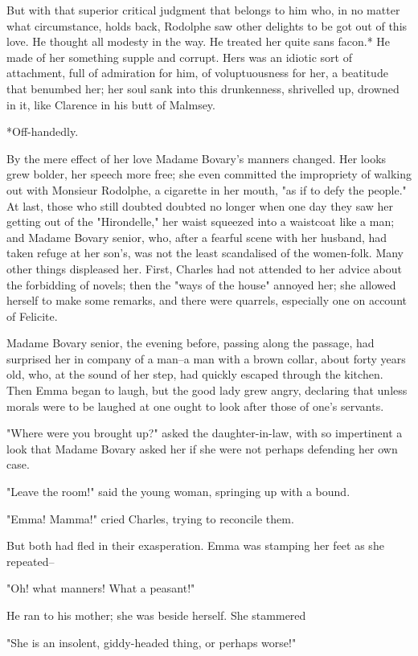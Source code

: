 \documentclass[11pt,twocolumn]{ltugboat}
\begin{document}
But with that superior critical judgment that belongs to him who, in no
matter what circumstance, holds back, Rodolphe saw other delights to be
got out of this love. He thought all modesty in the way. He treated her
quite sans facon.* He made of her something supple and corrupt. Hers
was an idiotic sort of attachment, full of admiration for him, of
voluptuousness for her, a beatitude that benumbed her; her soul sank
into this drunkenness, shrivelled up, drowned in it, like Clarence in
his butt of Malmsey.

     *Off-handedly.


By the mere effect of her love Madame Bovary's manners changed.
Her looks grew bolder, her speech more free; she even committed the
impropriety of walking out with Monsieur Rodolphe, a cigarette in her
mouth, "as if to defy the people." At last, those who still doubted
doubted no longer when one day they saw her getting out of the
"Hirondelle," her waist squeezed into a waistcoat like a man; and Madame
Bovary senior, who, after a fearful scene with her husband, had taken
refuge at her son's, was not the least scandalised of the women-folk.
Many other things displeased her. First, Charles had not attended to
her advice about the forbidding of novels; then the "ways of the house"
annoyed her; she allowed herself to make some remarks, and there were
quarrels, especially one on account of Felicite.

Madame Bovary senior, the evening before, passing along the passage,
had surprised her in company of a man--a man with a brown collar, about
forty years old, who, at the sound of her step, had quickly escaped
through the kitchen. Then Emma began to laugh, but the good lady grew
angry, declaring that unless morals were to be laughed at one ought to
look after those of one's servants.

"Where were you brought up?" asked the daughter-in-law, with so
impertinent a look that Madame Bovary asked her if she were not perhaps
defending her own case.

"Leave the room!" said the young woman, springing up with a bound.

"Emma! Mamma!" cried Charles, trying to reconcile them.

But both had fled in their exasperation. Emma was stamping her feet as
she repeated--

"Oh! what manners! What a peasant!"

He ran to his mother; she was beside herself. She stammered

"She is an insolent, giddy-headed thing, or perhaps worse!"
\end{document}

